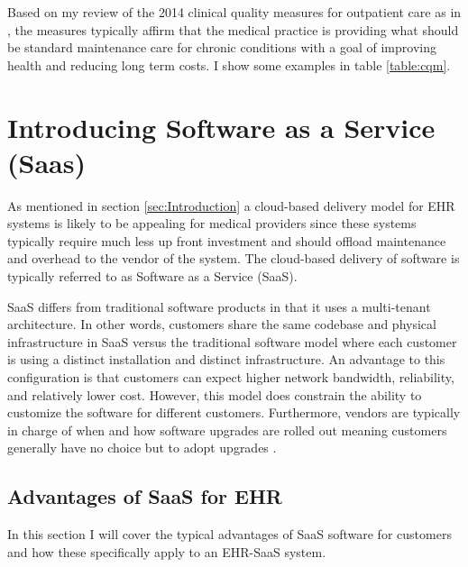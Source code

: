 \documentclass[10pt]{article}
\begin{document}
Based on my review of the 2014 clinical quality measures for outpatient care as in \cite{cqm-pdf}, the measures typically affirm that the medical practice is providing what should be standard maintenance care for chronic conditions with a goal of improving health and reducing long term costs. I show some examples in table \ref{table:cqm}.

\section{Introducing Software as a Service (Saas)}
\label{sec:Intro_SaaS}

As mentioned in section \ref{sec:Introduction} a cloud-based delivery model for EHR systems is likely to be appealing for medical providers since these systems typically require much less up front investment and should offload maintenance and overhead to the vendor of the system.
The cloud-based delivery of software is typically referred to as Software as a Service (SaaS).

SaaS differs from traditional software products in that it uses a multi-tenant architecture.
In other words, customers share the same codebase and physical infrastructure in SaaS versus the traditional software model where each customer is using a distinct installation and distinct infrastructure.
An advantage to this configuration is that customers can expect higher network bandwidth, reliability, and relatively lower cost.
However, this model does constrain the ability to customize the software for different customers.
Furthermore, vendors are typically in charge of when and how software upgrades are rolled out meaning customers generally have no choice but to adopt upgrades \cite{saasqual}.

\subsection{Advantages of SaaS for EHR}
\label{sec:SaaS Adantages}

In this section I will cover the typical advantages of SaaS software for customers and how these specifically apply to an EHR-SaaS system.
\end{document}

